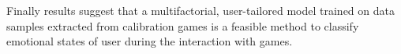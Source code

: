 Finally results suggest that a multifactorial, user-tailored model trained on data samples extracted from calibration games is a feasible method to classify emotional states of user during the interaction with games.




